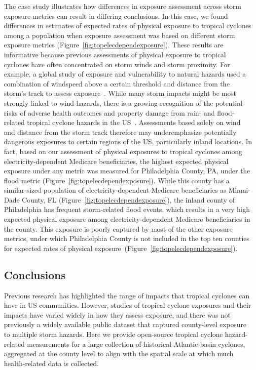 The case study illustrates how differences in exposure assessment across storm
exposure metrics can result in differing conclusions. In this case, we found
differences in estimates of expected rates of physical exposure to tropical
cyclones among a population when exposure assessment was based on different
storm exposure metrics (Figure~\ref{fig:topelecdependexposure}).  These results
are informative because previous assessments of physical exposure to tropical
cyclones have often concentrated on storm winds and storm proximity. For
example, a global study of exposure and vulnerability to natural hazards used a
combination of windspeed above a certain threshold and distance from the
storm's track to assess exposure~\parencite{peduzzi2009assessing}.  While many
storm impacts might be most strongly linked to wind hazards, there is a growing
recognition of the potential risks of adverse health outcomes and property
damage from rain- and flood-related tropical cyclone hazards in the
\ac{US}~\parencite{smith2009}.  Assessments based solely on wind and distance
from the storm track therefore may underemphasize potentially dangerous
exposures to certain regions of the \ac{US}, particularly inland locations.  In
fact, based on our assessment of physical exposures to tropical cyclones among
electricity-dependent Medicare beneficiaries, the highest expected physical
exposure under any metric was measured for Philadelphia County, PA, under the
flood metric (Figure~\ref{fig:topelecdependexposure}).  While this county has a
similar-sized population of electricity-dependent Medicare beneficiaries as
Miami-Dade County, FL (Figure~\ref{fig:topelecdependexposure}), the inland
county of Philadelphia has frequent storm-related flood events, which results
in a very high expected physical exposure among electricity-dependent Medicare
beneficiaries in the county. This exposure is poorly captured by most of the
other exposure metrics, under which Philadelphia County is not included in the
top ten counties for expected rates of physical
exposure~(Figure~\ref{fig:topelecdependexposure}).

\subsection*{Conclusions}

Previous research has highlighted the range of impacts that tropical cyclones
can have in \ac{US} communities. However, studies of tropical cyclone exposures
and their impacts have varied widely in how they assess exposure, and there was
not previously a widely available public dataset that captured county-level
exposure to multiple storm hazards. Here we provide open-source tropical
cyclone hazard-related measurements for a large collection of historical
Atlantic-basin cyclones, aggregated at the county level to align with the
spatial scale at which much health-related data is collected.

